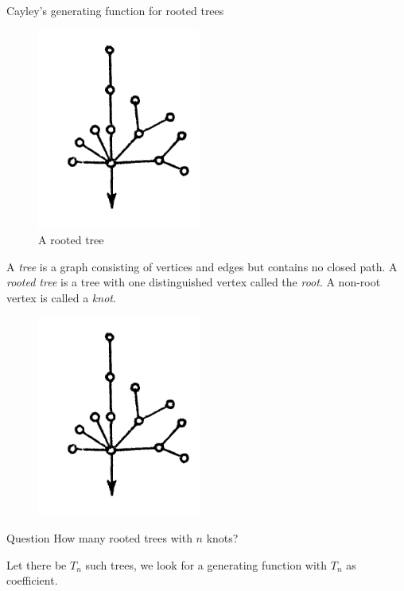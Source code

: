 \documentclass{beamer}
\begin{document}
    \begin{frame}{Cayley's generating function for rooted trees}
    \begin{figure}
        \centering
        \includegraphics[scale=0.5]{images/rooted-tree.png}
        \caption{A rooted tree}
        \label{fig:enter-label}
    \end{figure}
        \begin{definition}
            A \emph{tree} is a graph consisting of vertices and edges 
            but contains no closed path. A \emph{rooted tree} is a tree with one distinguished vertex called the \emph{root}. A non-root vertex is called a \emph{knot}.
        \end{definition}
    
    \end{frame}

    \begin{frame}
        \begin{figure}
        \centering
        \includegraphics[scale=0.7]{images/rooted-tree.png}
        \label{fig:enter-label}
    \end{figure}
    \begin{block}{Question}
        How many rooted trees with $n$ knots?
    \end{block}
    \pause
     Let there be $T_n$ such trees, we look for a generating function with 
    $T_n$ as coefficient.
    \end{frame}
    
\end{document}
